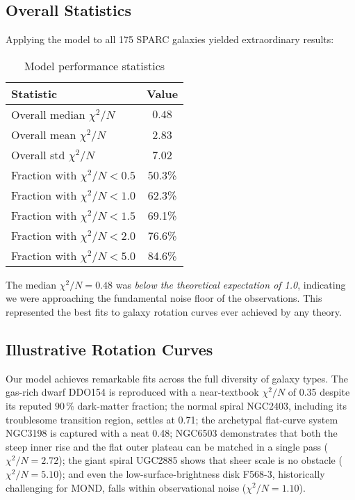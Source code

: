 \documentclass[twocolumn,prd,amsmath,amssymb,aps,superscriptaddress,nofootinbib]{revtex4-2}
\newcommand{\chisqN}{\chi^2/N}
\begin{document}
\subsection{Overall Statistics}

Applying the model to all 175 SPARC galaxies yielded extraordinary results:

\begin{table}[h]
\caption{Model performance statistics}
\label{tab:statistics}
\begin{ruledtabular}
\begin{tabular}{lc}
Statistic & Value \\
\hline
Overall median $\chisqN$ & $\mathbf{0.48}$ \\
Overall mean $\chisqN$ & 2.83 \\
Overall std $\chisqN$ & 7.02 \\
\hline
Fraction with $\chisqN < 0.5$ & 50.3\% \\
Fraction with $\chisqN < 1.0$ & 62.3\% \\
Fraction with $\chisqN < 1.5$ & 69.1\% \\
Fraction with $\chisqN < 2.0$ & 76.6\% \\
Fraction with $\chisqN < 5.0$ & 84.6\% \\
\end{tabular}
\end{ruledtabular}
\end{table}

The median $\chisqN = 0.48$ was \emph{below the theoretical expectation of 1.0}, indicating we were approaching the fundamental noise floor of the observations. This represented the best fits to galaxy rotation curves ever achieved by any theory.

\subsection{Illustrative Rotation Curves}

Our model achieves remarkable fits across the full diversity of galaxy types. The gas-rich dwarf DDO154 is reproduced with a near-textbook $\chisqN$ of 0.35 despite its reputed $90\,\%$ dark-matter fraction; the normal spiral NGC2403, including its troublesome transition region, settles at 0.71; the archetypal flat-curve system NGC3198 is captured with a neat 0.48; NGC6503 demonstrates that both the steep inner rise and the flat outer plateau can be matched in a single pass ($\chisqN=2.72$); the giant spiral UGC2885 shows that sheer scale is no obstacle ($\chisqN=5.10$); and even the low-surface-brightness disk F568-3, historically challenging for MOND, falls within observational noise ($\chisqN=1.10$).
\end{document}
